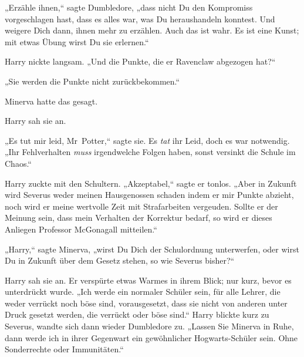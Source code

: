 „Erzähle ihnen,“ sagte Dumbledore, „dass nicht Du den Kompromiss vorgeschlagen hast, dass es alles war, was Du heraushandeln konntest. Und weigere Dich dann, ihnen mehr zu erzählen. Auch das ist wahr. Es ist eine Kunst; mit etwas Übung wirst Du sie erlernen.“

Harry nickte langsam. „Und die Punkte, die er Ravenclaw abgezogen hat?“

„Sie werden die Punkte nicht zurückbekommen.“

Minerva hatte das gesagt.

Harry sah sie an.

„Es tut mir leid, Mr~Potter,“ sagte sie. Es \emph{tat} ihr Leid, doch es war notwendig. „Ihr Fehlverhalten \emph{muss} irgendwelche Folgen haben, sonst versinkt die Schule im Chaos.“

Harry zuckte mit den Schultern. „Akzeptabel,“ sagte er tonlos. „Aber in Zukunft wird Severus weder meinen Hausgenossen schaden indem er mir Punkte abzieht, noch wird er meine wertvolle Zeit mit Strafarbeiten vergeuden. Sollte er der Meinung sein, dass mein Verhalten der Korrektur bedarf, so wird er dieses Anliegen Professor McGonagall mitteilen.“

„Harry,“ sagte Minerva, „wirst Du Dich der Schulordnung unterwerfen, oder wirst Du in Zukunft über dem Gesetz stehen, so wie Severus bisher?“

Harry sah sie an. Er verspürte etwas Warmes in ihrem Blick; nur kurz, bevor es unterdrückt wurde. „Ich werde ein normaler Schüler sein, für alle Lehrer, die weder verrückt noch böse sind, vorausgesetzt, dass sie nicht von anderen unter Druck gesetzt werden, die verrückt oder böse sind.“ Harry blickte kurz zu Severus, wandte sich dann wieder Dumbledore zu. „Lassen Sie Minerva in Ruhe, dann werde ich in ihrer Gegenwart ein gewöhnlicher Hogwarts-Schüler sein. Ohne Sonderrechte oder Immunitäten.“

